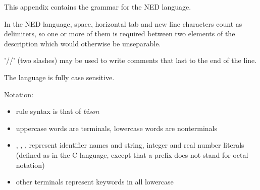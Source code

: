 \label{cha:ned-language-grammar}

This appendix contains the grammar for the NED language.

In the NED language, space, horizontal tab and new line characters count
as delimiters, so one or more of them is required between two elements of the
description which would otherwise be unseparable.

'//' (two slashes) may be used to write comments that last to the end of the line.

The language is fully case sensitive.

Notation:
\begin{itemize}
  \item rule syntax is that of \textit{bison}
  \item uppercase words are terminals, lowercase words are nonterminals
  \item {}, , ,
         represent identifier names and string,
        integer and real number literals (defined as in the C language,
        except that a  prefix does not stand for octal notation)
  \item other terminals represent keywords in all lowercase
\end{itemize}


%
%
%
%
%

